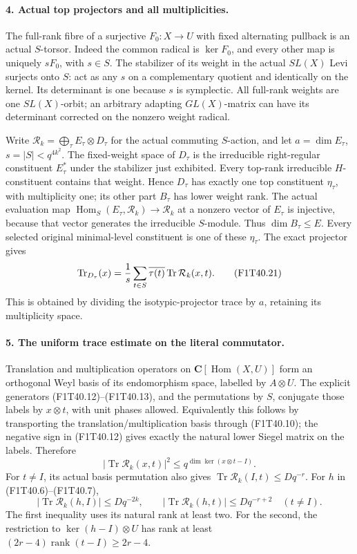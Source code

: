 \paragraph{4. Actual top projectors and all multiplicities.}
The full-rank fibre of a surjective \(F_0:X\to U\)
with fixed alternating pullback is an actual \(S\)-torsor.
Indeed the common radical is \(\ker F_0\), and every
other map is uniquely \(sF_0\), with \(s\in S\).
The stabilizer of its weight in the actual \(SL(X)\)
Levi surjects onto \(S\): act as any \(s\) on a
complementary quotient and identically on the kernel.
Its determinant is one because \(s\) is symplectic.
All full-rank weights are one \(SL(X)\)-orbit; an
arbitrary adapting \(GL(X)\)-matrix can have its
determinant corrected on the nonzero weight radical.

Write \(\mathcal R_k=\bigoplus_\tau E_\tau\otimes D_\tau\)
for the actual commuting \(S\)-action, and let
\(a=\dim E_\tau\), \(s=|S|<q^{4k^2}\).
The fixed-weight space of \(D_\tau\) is the irreducible
right-regular constituent \(E_\tau^*\) under the
stabilizer just exhibited. Every top-rank irreducible
\(H\)-constituent contains that weight. Hence
\(D_\tau\) has exactly one top constituent
\(\eta_\tau\), with multiplicity one; its other part
\(B_\tau\) has lower weight rank.
The actual evaluation map
\(\operatorname{Hom}_S(E_\tau,\mathcal R_k)\to\mathcal R_k\)
at a nonzero vector of \(E_\tau\) is injective, because
that vector generates the irreducible \(S\)-module.
Thus \(\dim B_\tau\le E\). Every selected original
minimal-level constituent is one of these \(\eta_\tau\).
The exact projector gives
\[
 \operatorname{Tr}_{D_\tau}(x)
      ={1\over s}\sum_{t\in S}\overline{\tau(t)}
                                  \operatorname{Tr}\mathcal R_k(x,t).
 \tag{F1T40.21}
\]
This is obtained by dividing the isotypic-projector trace
by \(a\), retaining its multiplicity space.

\paragraph{5. The uniform trace estimate on the literal commutator.}
Translation and multiplication operators on
\(\mathbf C[\operatorname{Hom}(X,U)]\) form an
orthogonal Weyl basis of its endomorphism space,
labelled by \(A\otimes U\). The explicit generators
(F1T40.12)--(F1T40.13), and the permutations by \(S\),
conjugate those labels by \(x\otimes t\), with unit
phases allowed. Equivalently this follows by transporting
the translation/multiplication basis through (F1T40.10);
the negative sign in (F1T40.12) gives exactly the natural
lower Siegel matrix on the labels. Therefore
\[
 |\operatorname{Tr}\mathcal R_k(x,t)|^2
                 \le q^{\dim\ker(x\otimes t-I)}.
 \tag{F1T40.22}
\]
For \(t\ne I\), its actual basis permutation also gives
\(\operatorname{Tr}\mathcal R_k(I,t)\le Dq^{-r}\).
For \(h\) in (F1T40.6)--(F1T40.7),
\[
 |\operatorname{Tr}\mathcal R_k(h,I)|\le Dq^{-2k},
 \qquad
 |\operatorname{Tr}\mathcal R_k(h,t)|\le Dq^{-r+2}
                               \quad(t\ne I).
 \tag{F1T40.23}
\]
The first inequality uses its natural rank at least two.
For the second, the restriction to
\(\ker(h-I)\otimes U\) has rank at least
\((2r-4)\operatorname{rank}(t-I)\ge2r-4\).

